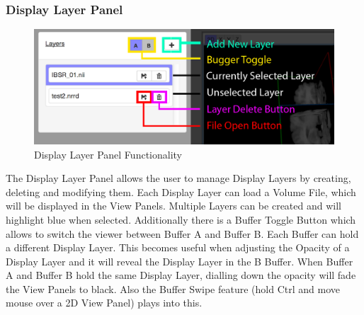 \documentclass[a4paper,11pt,titlepage]{article}
\begin{document}
\subsubsection{Display Layer Panel}

\begin{figure}[ht!]
\centering
\includegraphics[width=140mm]{graphics/features_03.png}
\caption{Display Layer Panel Functionality}
\label{fig:UIdesign1}
\end{figure}

The Display Layer Panel allows the user to manage Display Layers by creating, deleting and modifying them. Each Display Layer can load a Volume File, which will be displayed in the View Panels. Multiple Layers can be created and will highlight blue when selected. Additionally there is a Buffer Toggle Button which allows to switch the viewer between Buffer A and Buffer B. Each Buffer can hold a different Display Layer. This becomes useful when adjusting the Opacity of a Display Layer and it will reveal the Display Layer in the B Buffer. When Buffer A and Buffer B hold the same Display Layer, dialling down the opacity will fade the View Panels to black. Also the Buffer Swipe feature (hold Ctrl and move mouse over a 2D View Panel) plays into this.
\end{document}
